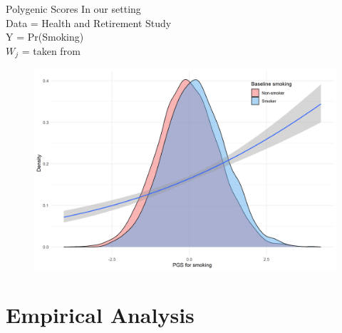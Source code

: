 \documentclass[10pt,compress,xcolor=dvipsnames,aspectratio=169]{beamer}    %
\newcounter{ex}
\newcommand{\1}[1]{\mathrm{1\hspace*{-2.5pt}l}[#1]}	%
\begin{document}
%
%
%
%
%
%
%


\begin{frame}{Polygenic Scores}
In our setting \\
Data = Health and Retirement Study \\
Y = Pr(Smoking) \\
$W_j$ = taken from \cite{GSCAN2019gwas}

\begin{figure}[hbtp]
\centering
\includegraphics[height=0.7\textheight]{../../3_output/make_histograms/pgs_density_6070_smoken_smooth.png}
\end{figure}

\end{frame}

\section{Empirical Analysis}
\end{document}
